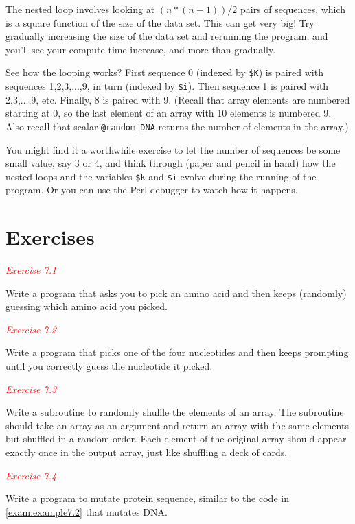 The nested loop involves looking at $(n * (n-1)) / 2$ pairs of sequences, which is a square function of the size of the data set. This can get very big! Try gradually increasing the size of the data set and rerunning the program, and you'll see your compute time increase, and more than gradually.

See how the looping works? First sequence 0 (indexed by \verb|$K|) is paired with sequences 1,2,3,...,9, in turn (indexed by \verb|$i|). Then sequence 1 is paired with 2,3,...,9, etc. Finally, 8 is paired with 9. (Recall that array elements are numbered starting at 0, so the last element of an array with 10 elements is numbered 9. Also recall that scalar \verb|@random_DNA| returns the number of elements in the array.)

You might find it a worthwhile exercise to let the number of sequences be some small value, say 3 or 4, and think through (paper and pencil in hand) how the nested loops and the variables \verb|$k| and \verb|$i| evolve during the running of the program. Or you can use the Perl debugger to watch how it happens. 

\section{Exercises}
\textcolor{red}{\textit{Exercise 7.1}}
\begin{adjustwidth}{1cm}{}
Write a program that asks you to pick an amino acid and then keeps (randomly) guessing which amino acid you picked. 
\end{adjustwidth}

\textcolor{red}{\textit{Exercise 7.2}}
\begin{adjustwidth}{1cm}{}
Write a program that picks one of the four nucleotides and then keeps prompting until you correctly guess the nucleotide it picked.
\end{adjustwidth}

\textcolor{red}{\textit{Exercise 7.3}}
\begin{adjustwidth}{1cm}{}
Write a subroutine to randomly shuffle the elements of an array. The subroutine should take an array as an argument and return an array with the same elements but shuffled in a random order. Each element of the original array should appear exactly once in the output array, just like shuffling a deck of cards. 
\end{adjustwidth}

\textcolor{red}{\textit{Exercise 7.4}}
\begin{adjustwidth}{1cm}{}
Write a program to mutate protein sequence, similar to the code in \autoref{exam:example7.2} that mutates DNA. 
\end{adjustwidth}

